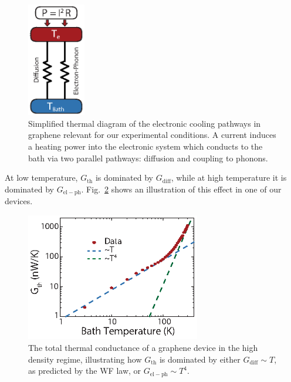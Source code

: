  \begin{figure}
\includegraphics[width=1in]{figures/Dirac_fluid/S5.eps}
\caption{Simplified thermal diagram of the electronic cooling pathways in graphene relevant for our experimental conditions.  A current induces a heating power into the electronic system which conducts to the bath via two parallel pathways:  diffusion and coupling to phonons.}
\label{fig:DF_S5}
\end{figure}

At low temperature, $G_{\mathrm{th}}$ is dominated by $G_{\mathrm{diff}}$, while at high temperature it is dominated by $G_{\mathrm{el-ph}}$.  Fig.~\ref{fig:DF_S6} shows an illustration of this effect in one of our devices.


 \begin{figure}
\includegraphics[width=3in]{figures/Dirac_fluid/S6.eps}
\caption{The total thermal conductance of a graphene device in the high density regime, illustrating how $G_{\mathrm{th}}$ is dominated by either $G_{\mathrm{diff}}\sim T$, as predicted by the WF law, or $G_{\mathrm{el-ph}}\sim T^4$.}
\label{fig:DF_S6}
\end{figure}

